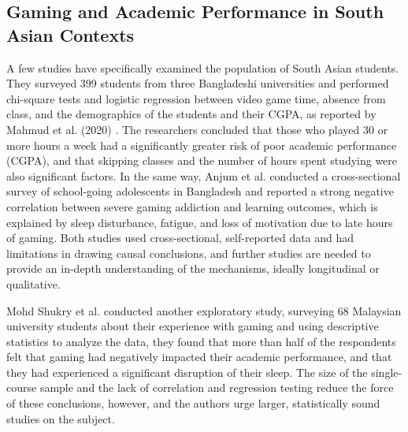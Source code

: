 \documentclass[conference]{IEEEtran}
\begin{document}
\subsection{Gaming and Academic Performance in South Asian Contexts}
A few studies have specifically examined the population of South Asian students. They surveyed 399 students from three Bangladeshi universities and performed chi-square tests and logistic regression between video game time, absence from class, and the demographics of the students and their CGPA, as reported by Mahmud et al. (2020) \cite{mahmud2020}. The researchers concluded that those who played 30 or more hours a week had a significantly greater risk of poor academic performance (CGPA), and that skipping classes and the number of hours spent studying were also significant factors. In the same way, Anjum et al. \cite{anjum2021} conducted a cross-sectional survey of school-going adolescents in Bangladesh and reported a strong negative correlation between severe gaming addiction and learning outcomes, which is explained by sleep disturbance, fatigue, and loss of motivation due to late hours of gaming. Both studies used cross-sectional, self-reported data and had limitations in drawing causal conclusions, and further studies are needed to provide an in-depth understanding of the mechanisms, ideally longitudinal or qualitative.

Mohd Shukry et al. \cite{shukry2021} conducted another exploratory study, surveying 68 Malaysian university students about their experience with gaming and using descriptive statistics to analyze the data, they found that more than half of the respondents felt that gaming had negatively impacted their academic performance, and that they had experienced a significant disruption of their sleep. The size of the single-course sample and the lack of correlation and regression testing reduce the force of these conclusions, however, and the authors urge larger, statistically sound studies on the subject.
\end{document}

